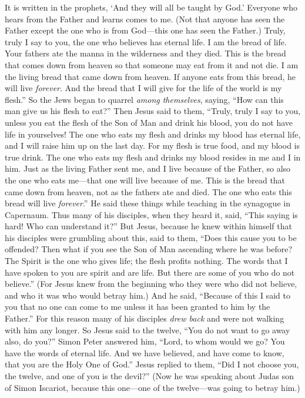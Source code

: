 \begin{biblechapter}
\verse It is written in the prophets, ‘And they will all be taught by God.’ Everyone who hears from the Father and learns comes to me.
\verse (Not that anyone has seen the Father except the one who is from God—this one has seen the Father.)
\verse Truly, truly I say to you, the one who believes has eternal life.
\verse I am the bread of life.
\verse Your fathers ate the manna in the wilderness and they died.
\verse This is the bread that comes down from heaven so that someone may eat from it and not die.
\verse I am the living bread that came down from heaven. If anyone eats from this bread, he will live \textit{forever}. And the bread that I will give for the life of the world is my flesh.”
\verse So the Jews began to quarrel \textit{among themselves}, saying, “How can this man give us his flesh to eat?”
\verse Then Jesus said to them, “Truly, truly I say to you, unless you eat the flesh of the Son of Man and drink his blood, you do not have life in yourselves!
\verse The one who eats my flesh and drinks my blood has eternal life, and I will raise him up on the last day.
\verse For my flesh is true food, and my blood is true drink.
\verse The one who eats my flesh and drinks my blood resides in me and I in him.
\verse Just as the living Father sent me, and I live because of the Father, so also the one who eats me—that one will live because of me.
\verse This is the bread that came down from heaven, not as the fathers ate and died. The one who eats this bread will live \textit{forever}.”
 He said these things while teaching in the synagogue in Capernaum.
\verse Thus many of his disciples, when they heard it, said, “This saying is hard! Who can understand it?”
\verse But Jesus, because he knew within himself that his disciples were grumbling about this, said to them, “Does this cause you to be offended?
\verse Then what if you see the Son of Man ascending where he was before?
\verse The Spirit is the one who gives life; the flesh profits nothing. The words that I have spoken to you are spirit and are life.
\verse But there are some of you who do not believe.” (For Jesus knew from the beginning who they were who did not believe, and who it was who would betray him.)
\verse And he said, “Because of this I said to you that no one can come to me unless it has been granted to him by the Father.”
 For this reason many of his disciples \textit{drew back} and were not walking with him any longer.
\verse So Jesus said to the twelve, “You do not want to go away also, do you?”
\verse Simon Peter answered him, “Lord, to whom would we go? You have the words of eternal life.
\verse And we have believed, and have come to know, that you are the Holy One of God.”
\verse Jesus replied to them, “Did I not choose you, the twelve, and one of you is the devil?”
\verse (Now he was speaking about Judas son of Simon Iscariot, because this one—one of the twelve—was going to betray him.)
\end{biblechapter}


